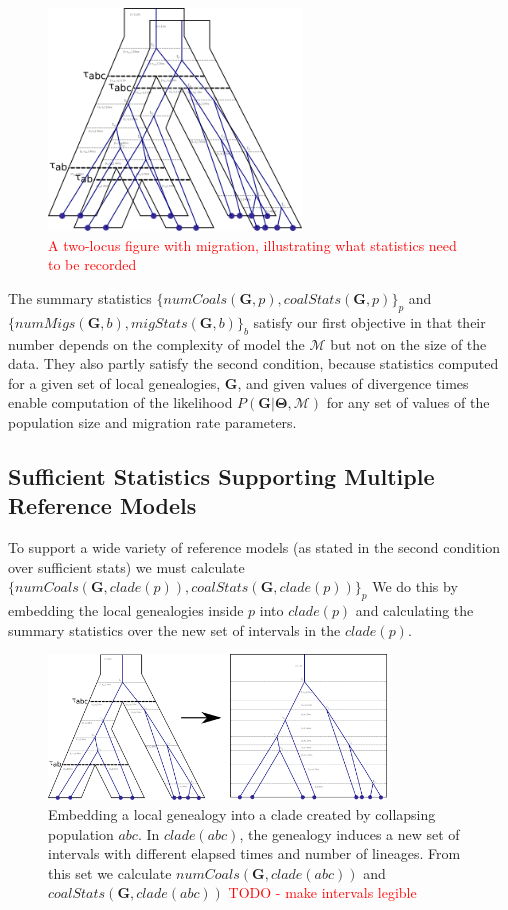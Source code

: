 \documentclass[11pt]{article}
\newcommand{\vect}[1]{\boldsymbol{\mathbf{#1}}}
\newcommand{\M}{\mathcal{M}}
\newcommand{\G}{\vect{G}}
\newcommand{\T}{\vect{\Theta}}
\newcommand{\1}{\mathbbm{1}}
\begin{document}
\begin{figure}[h]
\centering
\includegraphics[width=0.6\textwidth]
{two_locus}
\caption{\textcolor{red}{A two-locus figure with migration, illustrating what statistics need to be recorded}}
\end{figure}


The summary statistics $\{numCoals(\G,p), coalStats(\G,p)\}_p$ and $\{numMigs(\G,b), migStats(\G,b)\}_b$ satisfy our first objective in that their number depends on the complexity of model the $\M$ but not on the size of the data.
%
They also partly satisfy the second condition, because statistics computed for a given set of local genealogies, $\G$, and given values of divergence times enable computation of the likelihood $P(\G|\T,\M)$ for any set of values of the population size and migration rate parameters.
%

\subsection{Sufficient Statistics Supporting Multiple Reference Models}
To support a wide variety of reference models (as stated in the second condition over sufficient stats) we must calculate $\{numCoals(\G,clade(p)), coalStats(\G,clade(p))\}_p$%
We do this by embedding the local genealogies inside $p$ into $clade(p)$ and calculating the summary statistics over the new set of intervals in the $clade(p)$. 
\begin{figure}[h]
\centering
\includegraphics[width=0.8\textwidth]
{embed_in_null_model}
\caption{Embedding a local genealogy into a clade created by collapsing population $abc$. In $clade(abc)$, the genealogy induces a new set of intervals with different elapsed times and number of lineages. From this set we calculate $numCoals(\G,clade(abc))$ and $coalStats(\G,clade(abc))$ \textcolor{red}{TODO - make intervals legible}}
\end{figure}
\end{document}
